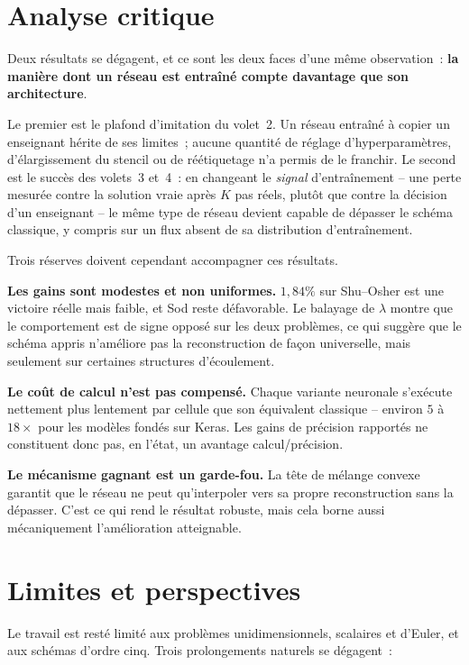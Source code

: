 \documentclass[12pt,a4paper,oneside]{report}
\begin{document}
\section{Analyse critique}

Deux résultats se dégagent, et ce sont les deux faces d'une même observation~:
\textbf{la manière dont un réseau est entraîné compte davantage que son
architecture}.

Le premier est le plafond d'imitation du volet~2. Un réseau entraîné à copier
un enseignant hérite de ses limites~; aucune quantité de réglage
d'hyperparamètres, d'élargissement du stencil ou de réétiquetage n'a permis de
le franchir. Le second est le succès des volets~3 et~4~: en changeant le
\emph{signal} d'entraînement -- une perte mesurée contre la solution vraie
après $K$ pas réels, plutôt que contre la décision d'un enseignant -- le même
type de réseau devient capable de dépasser le schéma classique, y compris sur
un flux absent de sa distribution d'entraînement.

Trois réserves doivent cependant accompagner ces résultats.

\textbf{Les gains sont modestes et non uniformes.} $1{,}84\%$ sur Shu--Osher est
une victoire réelle mais faible, et Sod reste défavorable. Le balayage de
$\lambda$ montre que le comportement est de signe opposé sur les deux
problèmes, ce qui suggère que le schéma appris n'améliore pas la reconstruction
de façon universelle, mais seulement sur certaines structures d'écoulement.

\textbf{Le coût de calcul n'est pas compensé.} Chaque variante neuronale
s'exécute nettement plus lentement par cellule que son équivalent classique --
environ $5$ à $18\times$ pour les modèles fondés sur Keras. Les gains de
précision rapportés ne constituent donc pas, en l'état, un avantage
calcul/précision.

\textbf{Le mécanisme gagnant est un garde-fou.} La tête de mélange convexe
garantit que le réseau ne peut qu'interpoler vers sa propre reconstruction sans
la dépasser. C'est ce qui rend le résultat robuste, mais cela borne aussi
mécaniquement l'amélioration atteignable.

\section{Limites et perspectives}

Le travail est resté limité aux problèmes unidimensionnels, scalaires et
d'Euler, et aux schémas d'ordre cinq. Trois prolongements naturels se dégagent~:
\end{document}
